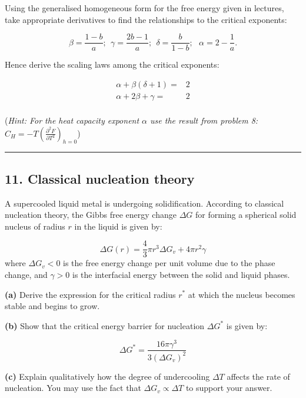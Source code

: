 \documentclass[
  letterpaper,
  DIV=11,
  numbers=noendperiod]{scrreprt}
\begin{document}
Using the generalised homogeneous form for the free energy given in
lectures, take appropriate derivatives to find the relationships to the
critical exponents:

\[
\beta=\frac{1-b}{a}; ~~ \gamma=\frac{2b-1}{a};~~ \delta= \frac{b}{1-b}; ~~~ \alpha=2-\frac{1}{a}.
\]

Hence derive the scaling laws among the critical exponents:

\begin{align}
\alpha+\beta(\delta+1)=& 2 \\
\alpha+2\beta+\gamma =& 2\\
\end{align}

(\emph{Hint: For the heat capacity exponent \(\alpha\) use the result
from problem 8:
\(C_H=-T\left(\frac{\partial^2F}{\partial T^2}\right)_{h=0}\)})

\begin{center}\rule{0.5\linewidth}{0.5pt}\end{center}

\subsection*{11. Classical nucleation
theory}\label{classical-nucleation-theory}

A supercooled liquid metal is undergoing solidification. According to
classical nucleation theory, the Gibbs free energy change \(\Delta G\)
for forming a spherical solid nucleus of radius \(r\) in the liquid is
given by:

\[
\Delta G(r) = \frac{4}{3}\pi r^3 \Delta G_v + 4\pi r^2 \gamma
\] where \(\Delta G_v < 0\) is the free energy change per unit volume
due to the phase change, and \(\gamma > 0\) is the interfacial energy
between the solid and liquid phases.

\textbf{(a)} Derive the expression for the critical radius \(r^*\) at
which the nucleus becomes stable and begins to grow.

\textbf{(b)} Show that the critical energy barrier for nucleation
\(\Delta G^*\) is given by:

\[
\Delta G^* = \frac{16\pi \gamma^3}{3 (\Delta G_v)^2}
\]

\textbf{(c)} Explain qualitatively how the degree of undercooling
\(\Delta T\) affects the rate of nucleation. You may use the fact that
\(\Delta G_v \propto \Delta T\) to support your answer.
\end{document}
